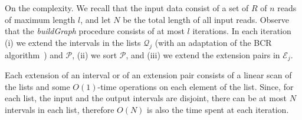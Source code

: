 \documentclass[runningheads,envcountsame,a4paper]{llncs}
\makeatletter
\newcommand{\paragrafo}{%
  \@startsection{paragraph}{4}{\z@ }{-7\p@ \@plus -4\p@ \@minus -4\p@
  }{-0.5em \@plus -0.22em \@minus -0.1em}{\normalfont \normalsize \itshape
  }
}
\makeatother
\begin{document}



\paragrafo{On the complexity.}
We recall that the input data consist of a set of  $R$ of $n$ reads of maximum
length $l$, and let $N$ be the total length of all input reads.
Observe that the \emph{buildGraph} procedure consists of  at most $l$ iterations.
In each iteration (i) we extend the intervals in the lists $\mathcal{Q}_j$ (with an
adaptation of the BCR algorithm~\cite{Bauer2013}) and $\mathcal P$, (ii) we sort
$\mathcal P$, and (iii) we extend the extension pairs in $\mathcal{E}_j$.

Each extension of an interval or of an extension pair consists of a linear scan
of the lists and some $O(1)$-time operations on each element of the list.
Since, for each list, the input and the output intervals are disjoint, there can
be at most $N$ intervals in each list, therefore $O(N)$ is also the time spent
at each iteration.


\begin{comment}
times the procedures ExtendQonLeft and ExtendQonRight.
In fact, those two procedures
apply the backward extension to every $Q$-interval in $\mathcal{Q}_j$ at
most $l$ times, since there can't be any interval related to a pattern
$Q$ such that $|Q| > l$. %

On the other hand the procedures ExtendQonLeft and ExtendQonRight aim to
build all the possible $Q$-intervals linked to the maximal overlaps
between the reads (the irreducible edges of the String Graph) by means of
an incremental approach that rely on the computation of the
$Q$-intervals during the previous steps.

Thus, the time complexity of these procedures may be measured by
considering the total number of possible $Q$-intervals that we have to
compute for every length of $Q$ (more precisely for $|Q| \in \{1 \dots
l\}$).

Then the total  complexity of ExtendQonLeft and ExtendQonRight is at
most $O(N_Q)$, where $N_Q$ is the total number of
$Q$-intervals (i.e. distinct substrings of $R$).

An estimate of $N_Q$ can be given as $O(l \times n)$ (let us recall that
the number of distinct strings in a word on length $x$ is  at most $x$
((Trovare articolo e citare)\cite{})).
\end{comment}
\end{document}
